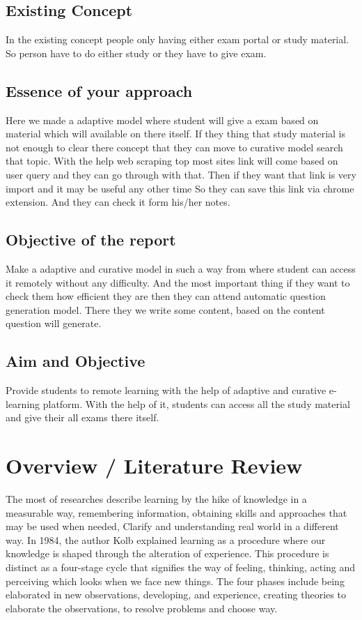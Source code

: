 \section{Existing Concept}
In the existing concept people only having either exam portal or study material. So person have to do either study or they have to give exam. 
\section{Essence of your approach}
Here we made a adaptive model where student will give a exam based on material which will available on there itself. If they thing that study material is not enough to clear there concept that they can move to curative model search that topic. With the help web scraping top most sites link will come based on user query and they can go through with that. Then if they want that link is very import and it may be useful any other time So they can save this link via chrome extension. And they can check it form his/her notes.
\section{Objective of the report}
Make a adaptive and curative model in such a way from where student can access it remotely without any difficulty. And the most important thing if they want to check them how efficient they are then they can attend automatic question generation model. There they we write some content, based on the content question will generate.
\section{Aim and Objective}
Provide students to remote learning with the help of adaptive and curative e-learning platform. With the help of it, students can access all the study material and give their all exams there itself.

\chapter{Overview / Literature Review }
The most of researches describe learning by the hike of knowledge in a measurable way, remembering information, obtaining skills and approaches that may be used when needed, Clarify and understanding real world in a different way. In 1984, the author Kolb explained learning as a procedure where our knowledge is shaped through the alteration of experience. This procedure is distinct as a four-stage cycle that signifies the way of feeling, thinking, acting and perceiving which looks when we face new things. The four phases include being elaborated in new observations, developing, and experience, creating theories to elaborate the observations, to resolve problems and choose way.

